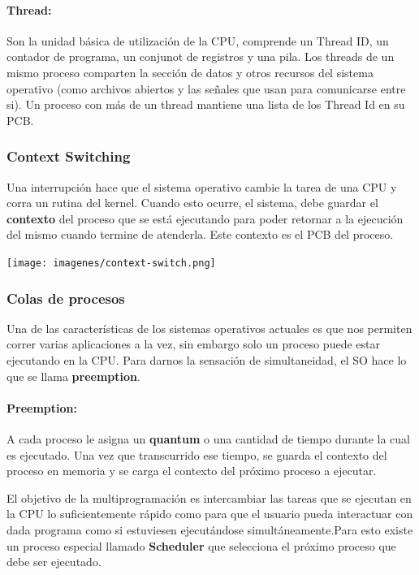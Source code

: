 \paragraph{Thread:} Son la unidad básica de utilización de la CPU, comprende un Thread ID, un contador de programa, un conjunot de registros y una pila. Los threads de un mismo proceso comparten la sección de datos y otros recursos del sistema operativo (como archivos abiertos y las señales que usan para comunicarse entre si). Un proceso con más de un thread mantiene una lista de los Thread Id en su PCB.
\subsubsection{Context Switching}
Una interrupción hace que el sistema operativo cambie la tarea de una CPU y corra un rutina del kernel. Cuando esto ocurre, el sistema, debe guardar el \textbf{contexto} del proceso que se está ejecutando para poder retornar a la ejecución del mismo cuando termine de atenderla. Este contexto es el PCB del proceso.

\vspace*{0.5cm}
\begin{center}
    \texttt{[image: imagenes/context-switch.png]}

\end{center}

    \subsubsection{Colas de procesos}
Una de las características de los sistemas operativos actuales es que nos permiten correr varias aplicaciones a la vez, sin embargo solo un proceso puede estar ejecutando en la CPU. Para darnos la sensación de simultaneidad, el SO hace lo que se llama \textbf{preemption}.

\paragraph{Preemption:} A cada proceso le asigna un \textbf{quantum} o una cantidad de tiempo durante la cual es ejecutado. Una vez que transcurrido ese tiempo, se guarda el contexto del proceso en memoria y se carga el contexto del próximo proceso a ejecutar.

El objetivo de la multiprogramación es intercambiar las tareas que se ejecutan en la CPU lo suficientemente rápido como para que el usuario pueda interactuar con dada programa como si estuviesen ejecutándose simultáneamente.Para esto existe un proceso especial llamado \textbf{Scheduler} que selecciona el próximo proceso que debe ser ejecutado.

